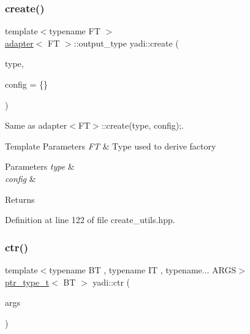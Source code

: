 \subsubsection{\texorpdfstring{create()}{create()}}
{\footnotesize\ttfamily template$<$typename FT $>$ \\
\hyperlink{structyadi_1_1adapter}{adapter}$<$ FT $>$\+::output\+\_\+type yadi\+::create (\begin{DoxyParamCaption}\item[{std\+::string const \&}]{type,  }\item[{Y\+A\+M\+L\+::\+Node const \&}]{config = {\ttfamily \{\}} }\end{DoxyParamCaption})}



Same as adapter$<$\+F\+T$>$\+::create(type, config);. 


\begin{DoxyTemplParams}{Template Parameters}
{\em FT} & Type used to derive factory \\
\hline
\end{DoxyTemplParams}

\begin{DoxyParams}{Parameters}
{\em type} & \\
\hline
{\em config} & \\
\hline
\end{DoxyParams}
\begin{DoxyReturn}{Returns}

\end{DoxyReturn}


Definition at line 122 of file create\+\_\+utils.\+hpp.

\mbox{\label{namespaceyadi_a82056df230021b8fc8be27978644629d}} 
\subsubsection{\texorpdfstring{ctr()}{ctr()}}
{\footnotesize\ttfamily template$<$typename BT , typename IT , typename... A\+R\+GS$>$ \\
\hyperlink{namespaceyadi_a92290eb27cd90666aa87b17d854af9fe}{ptr\+\_\+type\+\_\+t}$<$ BT $>$ yadi\+::ctr (\begin{DoxyParamCaption}\item[{A\+R\+G\+S...}]{args }\end{DoxyParamCaption})}




